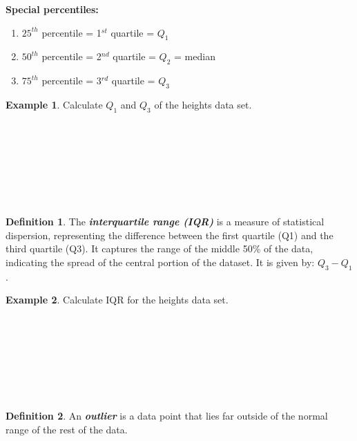 \documentclass[
  11pt,
  oneside]{book}
\providecommand{\tightlist}{%
  \setlength{\itemsep}{0pt}\setlength{\parskip}{0pt}}
\theoremstyle{definition}
\newtheorem{definition}{Definition}[chapter]
\theoremstyle{definition}
\newtheorem{example}{Example}[chapter]
\theoremstyle{definition}
\theoremstyle{definition}
\theoremstyle{remark}
\begin{document}
\textbf{Special percentiles:}

\begin{enumerate}
\def\labelenumi{\arabic{enumi}.}
\tightlist
\item
  \(25^{th}\) percentile = 1\(^{st}\) quartile = \(Q_1\)
\item
  \(50^{th}\) percentile = 2\(^{nd}\) quartile = \(Q_2\) = median
\item
  \(75^{th}\) percentile = 3\(^{rd}\) quartile = \(Q_3\)
\end{enumerate}

 \bigskip

\newpage

\begin{example}
Calculate \(Q_1\) and \(Q_3\) of the heights data set.
\end{example}

\(~\)

\(~\)

\(~\)

\(~\)

\begin{definition}
The \textbf{\emph{interquartile range (IQR)}} is a measure of statistical dispersion, representing the difference between the first quartile (Q1) and the third quartile (Q3). It captures the range of the middle 50\% of the data, indicating the spread of the central portion of the dataset. It is given by: \(Q_3 - Q_1\).
\end{definition}

\begin{example}
Calculate IQR for the heights data set.
\end{example}

\(~\)

\(~\)

\(~\)

\(~\)

\begin{definition}
An \textbf{\emph{outlier}} is a data point that lies far outside of the normal range of the rest of the data.
\end{definition}
\end{document}

